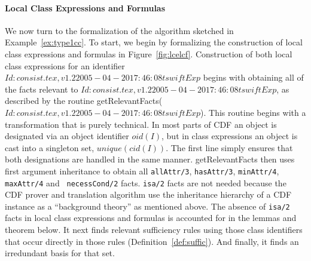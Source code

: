 \paragraph*{Local Class Expressions and Formulas}
We now turn to the formalization of the algorithm sketched in
Example~\ref{ex:type1cc}.  To start, we begin by formalizing the
construction of local class expressions and formulas in
Figure~\ref{fig:lcelcf}.  Construction of both local class expressions
for an identifier $Id: consist.tex,v 1.2 2005-04-20 17:46:08 tswift Exp $ begins with obtaining all of the facts relevant
to $Id: consist.tex,v 1.2 2005-04-20 17:46:08 tswift Exp $, as described by the routine {\sf getRelevantFacts($Id: consist.tex,v 1.2 2005-04-20 17:46:08 tswift Exp $)}.
This routine begins with a transformation that is purely technical.
In most parts of CDF an object is designated via an object identifier
$oid(I)$, but in class expressions an object is cast into a singleton
set, $unique(cid(I))$.  The first line simply ensures that both
designations are handled in the same manner.  {\sf getRelevantFacts}
then uses first argument inheritance to obtain all {\tt allAttr/3},
{\tt hasAttr/3}, {\tt minAttr/4}, {\tt maxAttr/4} and {\tt
necessCond/2} facts.  {\tt isa/2} facts are not needed because the CDF
prover and translation algorithm use the inheritance hierarchy of a
CDF instance as a ``background theory'' as mentioned above.  The
absence of {\tt isa/2} facts in local class expressions and formulas
is accounted for in the lemmas and theorem below. It next finds
relevant sufficiency rules using those class identifiers that occur
directly in those rules (Definition~\ref{def:suffic}).  And finally,
it finds an irredundant basis for that set.

